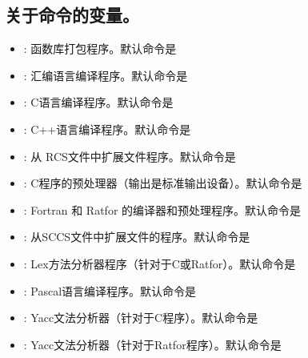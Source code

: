 \documentclass[a4paper,10pt]{sphinxmanual}
\begin{document}
\subsection{关于命令的变量。}
\label{\detokenize{implicit_rules:id5}}\begin{itemize}
\item {} 
 : 函数库打包程序。默认命令是 

\item {} 
 : 汇编语言编译程序。默认命令是 

\item {} 
 : C语言编译程序。默认命令是 

\item {} 
 : C++语言编译程序。默认命令是 

\item {} 
 : 从 RCS文件中扩展文件程序。默认命令是 

\item {} 
 : C程序的预处理器（输出是标准输出设备）。默认命令是 

\item {} 
 : Fortran 和 Ratfor 的编译器和预处理程序。默认命令是 

\item {} 
 : 从SCCS文件中扩展文件的程序。默认命令是 

\item {} 
 : Lex方法分析器程序（针对于C或Ratfor）。默认命令是 

\item {} 
 : Pascal语言编译程序。默认命令是 

\item {} 
 : Yacc文法分析器（针对于C程序）。默认命令是 

\item {} 
 : Yacc文法分析器（针对于Ratfor程序）。默认命令是 


\end{itemize}
\end{document}
